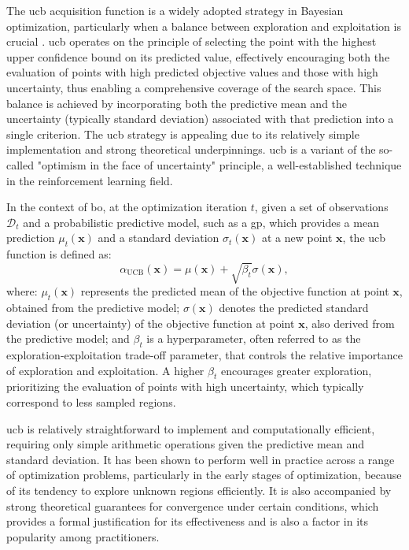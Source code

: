 The \acf{ucb} acquisition function is a widely adopted strategy in Bayesian optimization, particularly when a balance between exploration and exploitation is crucial \citep{auer2002finite, srinivas2009gaussian}. \ac{ucb} operates on the principle of selecting the point with the highest upper confidence bound on its predicted value, effectively encouraging both the evaluation of points with high predicted objective values and those with high uncertainty, thus enabling a comprehensive coverage of the search space. This balance is achieved by incorporating both the predictive mean and the uncertainty (typically standard deviation) associated with that prediction into a single criterion. The \ac{ucb} strategy is appealing due to its relatively simple implementation and strong theoretical underpinnings. \ac{ucb} is a variant of the so-called "optimism in the face of uncertainty" principle, a well-established technique in the reinforcement learning field.

In the context of \ac{bo}, at the optimization iteration $t$, given a set of observations $\mathcal{D}_t$ and a probabilistic predictive model, such as a \ac{gp}, which provides a mean prediction \(\mu_t(\mathbf{x})\) and a standard deviation \(\sigma_t(\mathbf{x})\) at a new point \(\mathbf{x}\), the \ac{ucb} function is defined as:
\begin{equation}
\alpha_{\text{UCB}}(\mathbf{x}) = \mu(\mathbf{x}) + \sqrt{\beta_t} \sigma(\mathbf{x}),
\label{eq:ucb_formula}
\end{equation}
where: \(\mu_t(\mathbf{x})\) represents the predicted mean of the objective function at point \(\mathbf{x}\), obtained from the predictive model; \(\sigma(\mathbf{x})\) denotes the predicted standard deviation (or uncertainty) of the objective function at point \(\mathbf{x}\), also derived from the predictive model; and \(\beta_t\) is a hyperparameter, often referred to as the exploration-exploitation trade-off parameter, that controls the relative importance of exploration and exploitation. A higher \(\beta_t\) encourages greater exploration, prioritizing the evaluation of points with high uncertainty, which typically correspond to less sampled regions.

\ac{ucb} is relatively straightforward to implement and computationally efficient, requiring only simple arithmetic operations given the predictive mean and standard deviation. It has been shown to perform well in practice across a range of optimization problems, particularly in the early stages of optimization, because of its tendency to explore unknown regions efficiently. It is also accompanied by strong theoretical guarantees for convergence under certain conditions, which provides a formal justification for its effectiveness and is also a factor in its popularity among practitioners.

